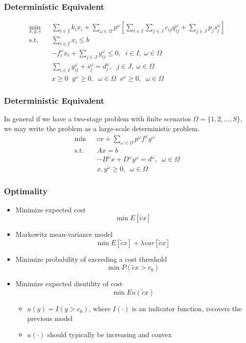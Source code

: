 \documentclass[12pt,handout]{beamer}
\begin{document}
\begin{frame}
\frametitle{Deterministic Equivalent}
\begin{eqnarray}
\min_{x,y,s} && \sum_{i \in I} k_i x_i + \sum_{\omega \in \Omega} p^\omega \left[ \sum_{i \in I} \sum_{j \in J} c_{ij} y_{ij}^\omega + \sum_{j \in J} p_j s_j^\omega \right] \nonumber \\
\mbox{s.t.} && \sum_{i \in I} x_i \le b \nonumber \\
&& -f_i^\omega x_i + \sum_{j \in J} y_{ij}^\omega \le 0,\;\;i \in I,\;\omega \in \Omega \nonumber \\
&& \sum_{i \in I} y_{ij}^\omega + s_j^\omega = d_j^\omega,\;\;j \in J,\;\omega \in \Omega \nonumber \\
&& x \ge 0 \;\; y^\omega \ge 0,\;\;\omega \in \Omega \;\; s^\omega \ge 0,\;\;\omega \in \Omega \nonumber
\end{eqnarray}
\end{frame}

\begin{frame}
\frametitle{Deterministic Equivalent}
In general if we have a two-stage problem with finite scenarios $\Omega = \{1,2,\ldots,S\}$, we may write the problem as a large-scale deterministic problem.
\begin{eqnarray}
\min && c x + \sum_{\omega \in \Omega} p^\omega f^\omega y^\omega \nonumber \\
\mbox{s.t.} && A x = b \nonumber \\
&& -B^\omega x + D^\omega y^\omega = d^\omega,\;\;\omega \in \Omega \nonumber \\
&& x, y^\omega \ge 0,\;\;\omega \in \Omega \nonumber
\end{eqnarray}
\end{frame}

\begin{frame}
\frametitle{Optimality}
\begin{itemize}
\item Minimize expected cost
\begin{equation}
\min E [\tilde{c} x] \nonumber
\end{equation}
\item Markowitz mean-variance model
\begin{equation}
\min E[\tilde{c} x] + \lambda var[\tilde{c}x] \nonumber
\end{equation}
\item Minimize probability of exceeding a cost threshold
\begin{equation}
\min P(\tilde{c} x > c_0) \nonumber
\end{equation}
\item Minimize expected disutility of cost
\begin{equation}
\min Eu(\tilde{c}x) \nonumber
\end{equation}
    \begin{itemize}
    \item $u(y) = I(y > c_0)$, where $I(\cdot)$ is an indicator function, recovers the previous model
    \item $u(\cdot)$ should typically be increasing and convex
    \end{itemize}
\end{itemize}
\end{frame}
\end{document}
